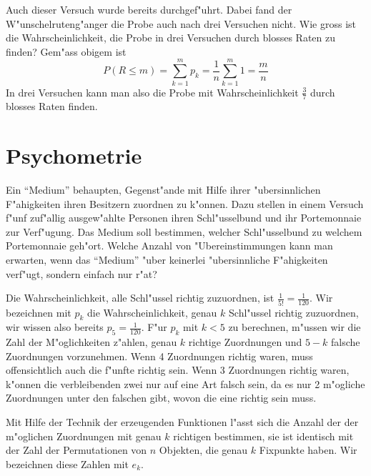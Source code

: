 Auch dieser Versuch wurde bereits durchgef"uhrt. Dabei fand der W"unschelruteng"anger
die Probe auch nach drei Versuchen nicht. Wie gross ist die Wahrscheinlichkeit,
die Probe in drei Versuchen durch blosses Raten zu finden? Gem"ass obigem ist
$$P(R\le m)= \sum_{k=1}^mp_k=\frac1n\sum_{k=1}^m1=\frac{m}{n}$$
In drei Versuchen kann man also die Probe mit Wahrscheinlichkeit $\frac37$ durch
blosses Raten finden.

\section{Psychometrie}
Ein ``Medium'' behaupten, Gegenst"ande mit Hilfe ihrer "ubersinnlichen F"ahigkeiten
ihren Besitzern zuordnen zu k"onnen. Dazu stellen in einem Versuch f"unf
zuf"allig ausgew"ahlte Personen ihren Schl"usselbund und ihr Portemonnaie zur
Ver\-f"ugung. Das Medium soll bestimmen, welcher Schl"usselbund zu welchem
Portemonnaie geh"ort.
Welche Anzahl von "Ubereinstimmungen kann man erwarten, wenn das ``Medium''
"uber keinerlei "ubersinnliche F"ahigkeiten verf"ugt, sondern einfach nur r"at?

Die Wahrscheinlichkeit, alle Schl"ussel richtig zuzuordnen, ist $\frac1{5!}=\frac1{120}$.
Wir bezeichnen mit $p_k$ die Wahrscheinlichkeit, genau $k$ Schl"ussel richtig zuzuordnen,
wir wissen also bereits $p_5=\frac1{120}$. F"ur $p_k$ mit $k<5$ zu berechnen, 
m"ussen wir die Zahl der M"oglichkeiten z"ahlen, genau $k$ richtige Zuordnungen
und $5-k$ falsche Zuordnungen vorzunehmen. Wenn 4 Zuordnungen richtig waren,
muss offensichtlich auch die f"unfte richtig sein. Wenn 3 Zuordnungen richtig waren,
k"onnen die verbleibenden zwei nur auf eine Art falsch sein, da es nur 2 m"ogliche
Zuordnungen unter den falschen gibt, wovon die eine richtig sein muss.

Mit Hilfe der Technik der erzeugenden Funktionen l"asst sich die Anzahl der
der m"oglichen Zuordnungen mit genau $k$ richtigen bestimmen, sie ist identisch
mit der Zahl der Permutationen von $n$ Objekten, die genau $k$ Fixpunkte haben.
Wir bezeichnen diese Zahlen mit $e_k$.

